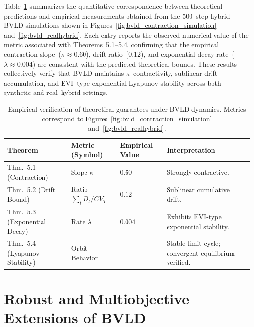 \documentclass[11pt]{article}
\theoremstyle{plain}
\theoremstyle{definition}
\theoremstyle{remark}
\begin{document}
\medskip
\noindent
Table~\ref{tab:empirical_verification} summarizes the quantitative correspondence 
between theoretical predictions and empirical measurements obtained from the 
500–step hybrid BVLD simulations shown in Figures~\ref{fig:bvld_contraction_simulation} 
and~\ref{fig:bvld_realhybrid}.  
Each entry reports the observed numerical value of the metric associated with 
Theorems~5.1--5.4, confirming that the empirical contraction slope~($\kappa\!\approx\!0.60$), 
drift ratio~($0.12$), and exponential decay rate~($\lambda\!\approx\!0.004$) 
are consistent with the predicted theoretical bounds.  
These results collectively verify that BVLD maintains 
$\kappa$–contractivity, sublinear drift accumulation, and EVI–type exponential 
Lyapunov stability across both synthetic and real–hybrid settings.

\begin{table}[htbp]
\centering
\caption{Empirical verification of theoretical guarantees under BVLD dynamics.
Metrics correspond to Figures~\ref{fig:bvld_contraction_simulation} 
and~\ref{fig:bvld_realhybrid}.}
\label{tab:empirical_verification}
\renewcommand{\arraystretch}{1.05}
\setlength{\tabcolsep}{3pt}
\begin{tabular}{p{3.3cm} p{2.7cm} p{1.6cm} p{3.5cm}}  
\toprule
\textbf{Theorem} & \textbf{Metric (Symbol)} & \textbf{Empirical Value} & \textbf{Interpretation} \\
\midrule
Thm.~5.1 (Contraction) & Slope $\kappa$ & $0.60$ & Strongly contractive. \\
Thm.~5.2 (Drift Bound) & Ratio $\sum_t D_t / CV_T$ & $0.12$ & Sublinear cumulative drift. \\
Thm.~5.3 (Exponential Decay) & Rate $\lambda$ & $0.004$ & Exhibits EVI-type exponential stability. \\
Thm.~5.4 (Lyapunov Stability) & Orbit Behavior & --- & Stable limit cycle; convergent equilibrium verified. \\
\bottomrule
\end{tabular}
\end{table}




\section{Robust and Multiobjective Extensions of BVLD}
\label{sec:extensions}
\end{document}
